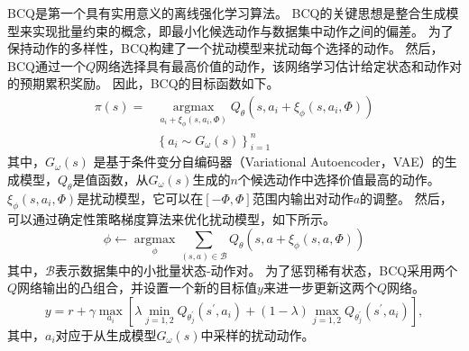 BCQ是第一个具有实用意义的离线强化学习算法。
BCQ的关键思想是整合生成模型来实现批量约束的概念，即最小化候选动作与数据集中动作之间的偏差。
为了保持动作的多样性，BCQ构建了一个扰动模型来扰动每个选择的动作。
然后，BCQ通过一个$Q$网络选择具有最高价值的动作，该网络学习估计给定状态和动作对的预期累积奖励。
因此，BCQ的目标函数如下。
\begin{equation}
    \begin{aligned}
    \pi(s)= & \underset{a_i+\xi_\phi\left(s, a_i, \Phi\right)}{\operatorname{argmax}} Q_\theta\left(s, a_i+\xi_\phi\left(s, a_i, \Phi\right)\right) \\
    & \left\{a_i \sim G_\omega(s)\right\}_{i=1}^n
    \end{aligned}
\end{equation}
其中，$G_\omega(s)$ 是基于条件变分自编码器（Variational Autoencoder，VAE）\cite{DBLP:journals/corr/KingmaW13}的生成模型，$Q_\theta$是值函数，从$G_\omega(s)$生成的$n$个候选动作中选择价值最高的动作。
$\xi_\phi\left(s, a_i, \Phi\right)$是扰动模型，它可以在$[-\Phi,\Phi]$范围内输出对动作$a$的调整。
然后，可以通过确定性策略梯度算法\cite{DBLP:conf/icml/SilverLHDWR14}来优化扰动模型，如下所示。
\begin{equation}
    \phi \leftarrow \underset{\phi}{\operatorname{argmax}} \sum_{(s, a) \in \mathcal{B}} Q_\theta\left(s, a+\xi_\phi(s, a, \Phi)\right)
\end{equation}
其中，$\mathcal{B}$表示数据集中的小批量状态-动作对。
为了惩罚稀有状态，BCQ采用两个$Q$网络输出的凸组合，并设置一个新的目标值$y$来进一步更新这两个$Q$网络。
\begin{equation}
    y = r+\gamma \max _{a_i}\left[\lambda \min _{j=1,2} Q_{\theta_j^{\prime}}\left(s^{\prime}, a_i\right)+(1-\lambda) \max _{j=1,2} Q_{\theta_j^{\prime}}\left(s^{\prime}, a_i\right)\right], \nonumber
\end{equation}
其中，$a_i$对应于从生成模型$G_\omega(s)$中采样的扰动动作。

